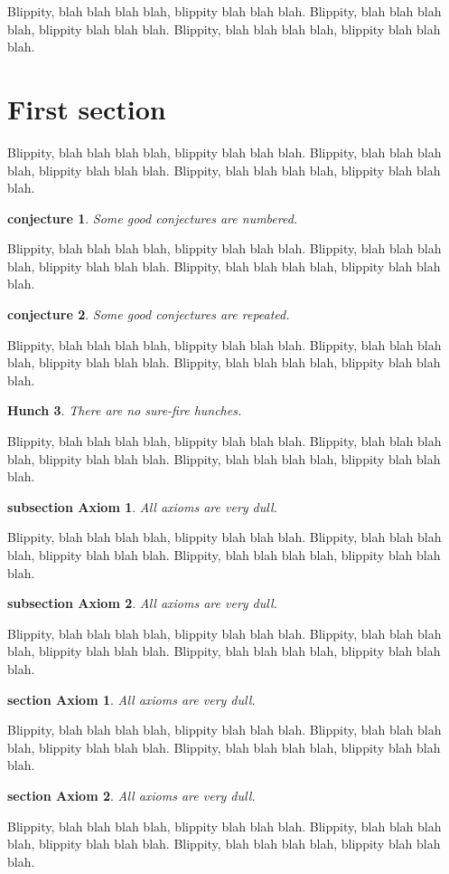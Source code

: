 ﻿\documentclass{article}
\newtheorem{guess}{conjecture}
\newtheorem{axiom}{subsection Axiom}[subsection]
\newtheorem{axioms}{section Axiom}[section]
\newtheorem{hunch}[guess]{Hunch}
\begin{document}
Blippity, blah blah blah blah, blippity blah blah blah.
Blippity, blah blah blah blah, blippity blah blah blah.
Blippity, blah blah blah blah, blippity blah blah blah.
\section{First section}
Blippity, blah blah blah blah, blippity blah blah blah.
Blippity, blah blah blah blah, blippity blah blah blah.
Blippity, blah blah blah blah, blippity blah blah blah.
\begin{guess}Some good conjectures are numbered.\end{guess}
Blippity, blah blah blah blah, blippity blah blah blah.
Blippity, blah blah blah blah, blippity blah blah blah.
Blippity, blah blah blah blah, blippity blah blah blah.
\begin{guess}Some good conjectures are repeated.\end{guess}
Blippity, blah blah blah blah, blippity blah blah blah.
Blippity, blah blah blah blah, blippity blah blah blah.
Blippity, blah blah blah blah, blippity blah blah blah.
\begin{hunch} There are no sure-fire hunches. \end{hunch}
Blippity, blah blah blah blah, blippity blah blah blah.
Blippity, blah blah blah blah, blippity blah blah blah.
Blippity, blah blah blah blah, blippity blah blah blah.
\begin{axiom} All axioms are very dull. \end{axiom}
Blippity, blah blah blah blah, blippity blah blah blah.
Blippity, blah blah blah blah, blippity blah blah blah.
Blippity, blah blah blah blah, blippity blah blah blah.
\begin{axiom} All axioms are very dull. \end{axiom}
Blippity, blah blah blah blah, blippity blah blah blah.
Blippity, blah blah blah blah, blippity blah blah blah.
Blippity, blah blah blah blah, blippity blah blah blah.
\begin{axioms} All axioms are very dull. \end{axioms}
Blippity, blah blah blah blah, blippity blah blah blah.
Blippity, blah blah blah blah, blippity blah blah blah.
Blippity, blah blah blah blah, blippity blah blah blah.
\begin{axioms} All axioms are very dull. \end{axioms}
Blippity, blah blah blah blah, blippity blah blah blah.
Blippity, blah blah blah blah, blippity blah blah blah.
Blippity, blah blah blah blah, blippity blah blah blah.
\end{document}
